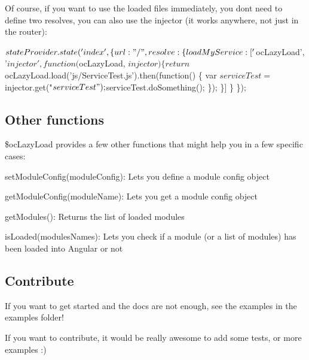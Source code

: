 Of course, if you want to use the loaded files immediately, you don\textquotesingle{}t need to define two resolves, you can also use the injector (it works anywhere, not just in the router)\+: 
\begin{DoxyCode}
$stateProvider.state('index', \{
  url: "/",
  resolve: \{
    loadMyService: ['$ocLazyLoad', '$injector', function($ocLazyLoad, $injector) \{
      return $ocLazyLoad.load('js/ServiceTest.js').then(function() \{
        var $serviceTest = $injector.get("$serviceTest");
        $serviceTest.doSomething();
      \});
    \}]
  \}
\});
\end{DoxyCode}


\subsection*{Other functions}

{\ttfamily \$oc\+Lazy\+Load} provides a few other functions that might help you in a few specific cases\+:


\begin{DoxyItemize}
\item {\ttfamily set\+Module\+Config(module\+Config)}\+: Lets you define a module config object
\item {\ttfamily get\+Module\+Config(module\+Name)}\+: Lets you get a module config object
\item {\ttfamily get\+Modules()}\+: Returns the list of loaded modules
\item {\ttfamily is\+Loaded(modules\+Names)}\+: Lets you check if a module (or a list of modules) has been loaded into Angular or not
\end{DoxyItemize}

\subsection*{Contribute}

If you want to get started and the docs are not enough, see the examples in the \textquotesingle{}examples\textquotesingle{} folder!

If you want to contribute, it would be really awesome to add some tests, or more examples \+:) 